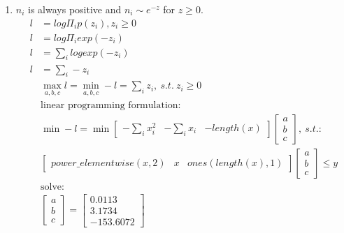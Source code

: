 \documentclass[12pt,letter]{article}
\begin{document}
\begin{enumerate}
\begin{enumerate}
\item $n_i$ is always positive and $n_i \sim e^{-z}$ for $z \geq 0$.
  \begin{align*}
    l &= log \Pi_i p(z_i), z_i \geq 0\\
    l &= log \Pi_i exp(-z_i)\\
    l &= \sum_i log exp(-z_i)\\
    l &= \sum_i -z_i\\
      &\max_{a,b,c} l = \min_{a,b,c} -l = \sum_i z_i,\ s.t.\ z_i \geq 0\\
      &\text{linear programming formulation:}\\
    &\min -l = \min
    \begin{bmatrix}
      -\sum_i x_i^2 & -\sum_i x_i & -length(x)
    \end{bmatrix}
                                    \begin{bmatrix}
                                      a\\b\\c
                                    \end{bmatrix},\ s.t.:\\
    &\begin{bmatrix}
      power\_elementwise(x,2) & x & ones(length(x),1)
    \end{bmatrix}
    \begin{bmatrix}
      a\\b\\c
    \end{bmatrix}
    \leq y\\
      &\text{solve:}\\
    &\begin{bmatrix}
      a\\b\\c
    \end{bmatrix} =\begin{bmatrix}0.0113 \\ 3.1734 \\ -153.6072 \end{bmatrix}
  \end{align*}


\end{enumerate}
\end{enumerate}
\end{document}
